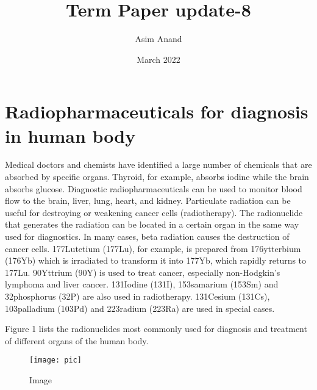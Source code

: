 \documentclass{article}
\title{Term Paper update-8}
\author{Asim Anand}
\date{March 2022}
\begin{document}
\maketitle

\section{Radiopharmaceuticals for diagnosis in human body }
Medical doctors and chemists have identified a large  number of  chemicals that  are absorbed  by specific  organs.  Thyroid,  for  example,  absorbs iodine while the brain absorbs glucose. Diagnostic radiopharmaceuticals can be used to monitor blood flow to the brain, liver, lung, heart, and kidney. Particulate  radiation  can  be  useful  for destroying  or  weakening  cancer  cells (radiotherapy). The radionuclide that generates the radiation can be located in a certain organ in the same way used for diagnostics. In many cases, beta radiation  causes  the  destruction  of  cancer  cells. 177Lutetium (177Lu), for example, is prepared from 176ytterbium  (176Yb)  which  is  irradiated  to transform  it  into  177Yb, which rapidly  returns to 177Lu.  90Yttrium  (90Y)  is  used  to  treat  cancer, especially  non-Hodgkin’s  lymphoma  and  liver cancer.  131Iodine  (131I),  153samarium  (153Sm)  and 32phosphorus (32P) are  also used in  radiotherapy. 131Cesium  (131Cs),  103palladium  (103Pd)  and 223radium (223Ra) are used in special cases.


Figure 1 lists the radionuclides most commonly used for diagnosis and treatment of different organs of the human body. 


\begin{figure}[htp]
    \centering
    \texttt{[image: pic]}
    \caption{Image}
    \label{fig:galaxy}
\end{figure}
\end{document}
